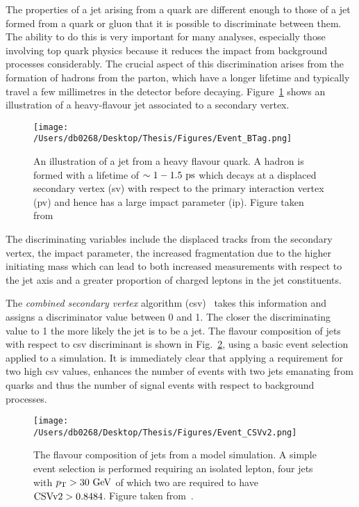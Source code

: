 The properties of a jet arising from a \bquark{} quark are different enough to those of a jet formed from a \uquark{}\dquark{}\squark{} quark or gluon that it is possible to discriminate between them.
The ability to do this is very important for many analyses, especially those involving top quark physics because it reduces the impact from background processes considerably.
The crucial aspect of this discrimination arises from the formation of \bquark{} hadrons from the \bquark{} parton, which have a longer lifetime and typically travel a few millimetres in the detector before decaying.
Figure~\ref{fig:secvert} shows an illustration of a heavy-flavour jet associated to a secondary vertex.
\begin{figure}[htpb]
	\centering
	\texttt{[image: /Users/db0268/Desktop/Thesis/Figures/Event\_BTag.png]}
	\caption[An illustration of a jet from a heavy flavour quark. A hadron is formed with a lifetime of $\sim1-1.5\ps$ which decays at a displaced secondary vertex (\acrshort{sv}) with respect to the primary interaction vertex (\acrshort{pv}) and hence has a large impact parameter (\acrshort{ip}).]{An illustration of a jet from a heavy flavour quark. A hadron is formed with a lifetime of $\sim1-1.5\ps$ which decays at a displaced secondary vertex (\acrshort{sv}) with respect to the primary interaction vertex (\acrshort{pv}) and hence has a large impact parameter (\acrshort{ip}). Figure taken from~\cite{Event:BTV}}
	\label{fig:secvert}
\end{figure}
The discriminating variables include the displaced tracks from the secondary vertex, the impact parameter, the increased fragmentation due to the higher initiating mass which can lead to both increased \pt{} measurements with respect to the jet axis and a greater proportion of charged leptons in the jet constituents.

The \textit{combined secondary vertex} algorithm (\acrshort{csv})~\cite{Event:BTV} takes this information and assigns a discriminator value between 0 and 1.
The closer the discriminating value to 1 the more likely the jet is to be a \bquark{} jet.
The flavour composition of jets with respect to \acrshort{csv} discriminant is shown in Fig.~\ref{fig:csv}, using a basic event selection applied to a \ttbar{} simulation.
It is immediately clear that applying a requirement for two high \acrshort{csv} values, enhances the number of events with two jets emanating from \bquark{} quarks and thus the number of signal \ttbar{} events with respect to background processes.
\begin{figure}[htpb!]
	\centering
	\texttt{[image: /Users/db0268/Desktop/Thesis/Figures/Event\_CSVv2.png]}
	\caption[The flavour composition of jets from a \ttbar{} model simulation. A simple event selection is performed requiring an isolated lepton, four jets with $\pt>30\GeV$ of which two are required to have $\CSV>0.8484$.]{The flavour composition of jets from a \ttbar{} model simulation. A simple event selection is performed requiring an isolated lepton, four jets with $\pt>30\GeV$ of which two are required to have $\CSV>0.8484$. Figure taken from~\cite{Event:BTV}.}
	\label{fig:csv}
\end{figure}

